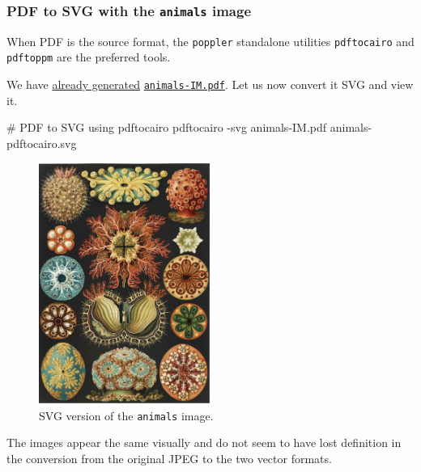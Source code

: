 \documentclass[
  11pt,
  british,
  a4paper,
]{article}
\newenvironment{Shaded}{\begin{snugshade}}{\end{snugshade}}
\newcommand{\AttributeTok}[1]{\textcolor[rgb]{0.80,0.80,0.80}{#1}}
\newcommand{\CommentTok}[1]{\textcolor[rgb]{0.50,0.62,0.50}{#1}}
\newcommand{\ExtensionTok}[1]{\textcolor[rgb]{0.80,0.80,0.80}{#1}}
\newcommand{\NormalTok}[1]{\textcolor[rgb]{0.80,0.80,0.80}{#1}}
\begin{document}
\hypertarget{pdf-to-svg-with-the-animals-image}{%
\subsubsection{\texorpdfstring{PDF to SVG with the \texttt{animals}
image}{PDF to SVG with the animals image}}\label{pdf-to-svg-with-the-animals-image}}

When PDF is the source format, the \texttt{poppler} standalone utilities
\texttt{pdftocairo} and \texttt{pdftoppm} are the preferred tools.

We have
\protect\hyperlink{raster-to-pdf-with-convert-for-animals}{already
generated} \href{images/animals-IM.pdf}{\texttt{animals-IM.pdf}}. Let us
now convert it SVG and view it.

\begin{Shaded}
\begin{Highlighting}[]
\CommentTok{\# PDF to SVG using pdftocairo}
\ExtensionTok{pdftocairo} \AttributeTok{{-}svg}\NormalTok{ animals{-}IM.pdf animals{-}pdftocairo.svg}
\end{Highlighting}
\end{Shaded}

\begin{figure}
\hypertarget{fig:animals-pdftocairo-svg}{%
\centering
\includegraphics[width=0.5\textwidth,height=\textheight]{images/animals-pdftocairo.svg}
\caption{SVG version of the \texttt{animals}
image.}\label{fig:animals-pdftocairo-svg}
}
\end{figure}

The images appear the same visually and do not seem to have lost
definition in the conversion from the original JPEG to the two vector
formats.
\end{document}
